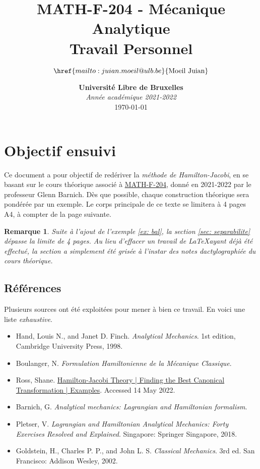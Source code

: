 \documentclass[11pt,oneside,a4paper]{article}
\title{\textbf{MATH-F-204 - Mécanique Analytique} \\ Travail Personnel}
\author{$\href{mailto:juian.moeil@ulb.be}{\text{Moeil Juian}}$}
\date{%
  \textbf{Université Libre de Bruxelles} \\
  \emph{Année académique 2021-2022}\\
  \today
}
\newtheorem{remark}[theorem]{Remarque}
\begin{document}
    \maketitle
    \nopagebreak

    \section{Objectif ensuivi}
    Ce document a pour objectif de redériver la \emph{méthode de Hamilton-Jacobi}, en se basant sur le cours théorique associé à \href{https://www.ulb.be/fr/programme/math-f204}{MATH-F-204}, donné en 2021-2022 par le professeur Glenn Barnich. Dès que possible, chaque construction théorique sera pondérée par un exemple. Le corps principale de ce texte se limitera à 4 pages A4, à compter de la page suivante.
    
    \begin{remark}
      Suite à l'ajout de l'exemple \ref{ex: bal}, la section \ref{sec: separabilite} dépasse la limite de 4 pages. Au lieu d'effacer un travail de \LaTeX ayant déjà été effectué, la section a simplement été grisée à l'instar des notes dactylographiée du cours théorique.  
    \end{remark}
    \subsection{Références}\label{sec:bibliographie}
    Plusieurs sources ont été exploitées pour mener à bien ce travail. En voici une liste \emph{exhaustive}.
    \begin{itemize}
        \item Hand, Louis N., and Janet D. Finch. \emph{Analytical Mechanics}. 1st edition, Cambridge University Press, 1998.
        \item Boulanger, N. \emph{Formulation Hamiltonienne de la Mécanique Classique}.
        \item Ross, Shane. \href{https://youtu.be/nFpC1s1joRU}{Hamilton-Jacobi Theory | Finding the Best Canonical Transformation | Examples}. Accessed 14 May 2022.
        \item Barnich, G. \emph{Analytical mechanics: Lagrangian and Hamiltonian formalism}.
        \item Pletser, V. \emph{Lagrangian and Hamiltonian Analytical Mechanics: Forty Exercises Resolved and Explained}. Singapore: Springer Singapore, 2018.
        \item Goldstein, H., Charles P. P., and John L. S. \emph{Classical Mechanics}. 3rd ed. San Francisco: Addison Wesley, 2002.
      
    \end{itemize}
\end{document}
